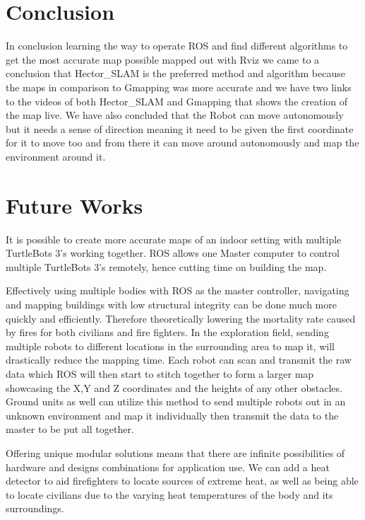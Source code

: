 \documentclass[12pt]{report}
\begin{document}
\vspace{1em}
\chapter{Conclusion}
In conclusion learning the way to operate ROS and find different algorithms to get the most accurate map possible mapped out with Rviz we came to a conclusion that Hector\_SLAM is the preferred method and algorithm because the maps in comparison to Gmapping was more accurate and we have two links to the videos of both Hector\_SLAM and Gmapping that shows the creation of the map live. We have also concluded that the Robot can move autonomously but it needs a sense of direction meaning it need to be given the first coordinate for it to move too and from there it can move around autonomously and map the environment around it.\par

\chapter{Future Works}
It is possible to create more accurate maps of an indoor setting with multiple TurtleBots 3's working together. ROS allows one Master computer to control multiple TurtleBots 3's remotely, hence cutting time on building the map.\par
\vspace{1em}
Effectively using multiple bodies with ROS as the master controller, navigating and mapping buildings with low structural integrity can be done much more quickly and efficiently. Therefore theoretically lowering the mortality rate caused by fires for both civilians and fire fighters. In the exploration field, sending multiple robots to different locations in the surrounding area to map it, will drastically reduce the mapping time. Each robot can scan and transmit the raw data which ROS will then start to stitch together to form a larger map showcasing the X,Y and Z coordinates and the heights of any other obstacles. Ground units as well can utilize this method to send multiple robots out in an unknown environment and map it individually then transmit the data to the master to be put all together.\par
\vspace{1em}
Offering unique modular solutions means that there are infinite possibilities of hardware and designs combinations for application use. We can add a heat detector to aid firefighters to locate sources of extreme heat, as well as being able to locate civilians due to the varying heat temperatures of the body and its surroundings.\par
\end{document}
